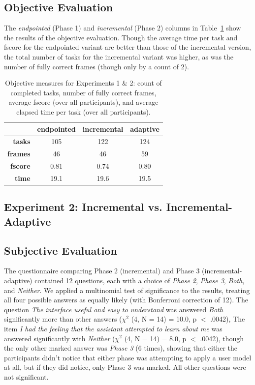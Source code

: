 \documentclass[11pt]{article}
\begin{document}
\subsection{Objective Evaluation}  The \emph{endpointed} (Phase 1) and \emph{incremental} (Phase 2) columns in Table~\ref{tab:objscores} show the results of the objective evaluation. Though the average time per task and fscore for the endpointed variant are better than those of the incremental version, the total number of tasks for the incremental variant was higher, as was the number of fully correct frames (though only by a count of 2). 


\begin{table}
 \begin{tabular}{|r|c|c|c|}
\hline
                     & \textbf{endpointed} & \textbf{incremental} & \textbf{adaptive} \\
\hline
\textbf{tasks} & 105 & 122 & 124  \\
\textbf{frames} & 46 & 46 & 59 \\
\textbf{fscore} & 0.81 & 0.74 & 0.80 \\
\textbf{time} & 19.1 & 19.6 & 19.5 \\
 \hline
\end{tabular}
\caption{Objective measures for Experiments 1 \& 2: count of completed tasks, number of fully correct frames, average fscore (over all participants), and average elapsed time per task (over all participants).}
\label{tab:objscores}
\end{table}

\subsection{Experiment 2: Incremental vs. Incremental-Adaptive}
\label{section:exp2}

\subsection{Subjective Evaluation} The questionnaire comparing Phase 2 (incremental) and Phase 3 (incremental-adaptive) contained 12 questions, each with a choice of \emph{Phase 2}, \emph{Phase 3}, \emph{Both}, and \emph{Neither}.  We applied a multinomial test of significance to the results, treating all four possible answers as equally likely (with Bonferroni correction of 12). The question \emph{The interface useful and easy to understand} was answered \emph{Both} significantly more than other answers  ($ \chi^2 $ (4, N = 14) = 10.0, p $<$ .0042), The item \emph{I had the feeling that the assistant attempted to learn about me} was answered significantly with \emph{Neither} ($ \chi^2 $ (4, N = 14) = 8.0, p $<$ .0042), though the only other marked answer was \emph{Phase 3} (6 times), showing that either the participants didn't notice that either phase was attempting to apply a user model at all, but if they did notice, only Phase 3 was marked. All other questions were not significant.
\end{document}
